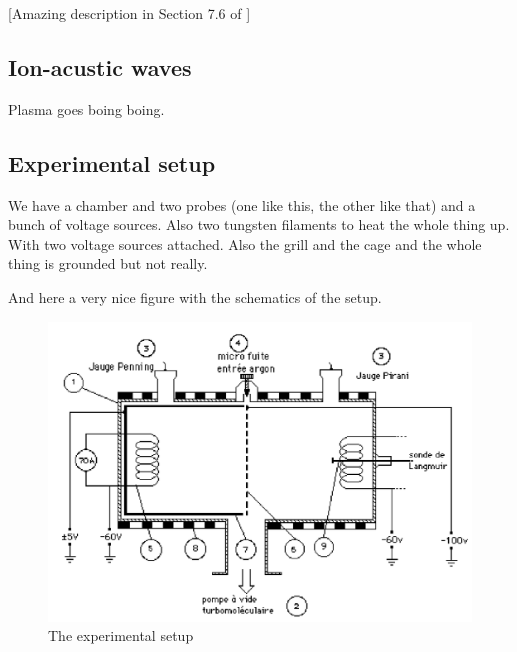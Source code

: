 [Amazing description in Section 7.6 of \cite{piel_plasma_2017}]

\subsection{Ion-acustic waves}
Plasma goes boing boing.

\subsection{Experimental setup}
We have a chamber and two probes (one like this, the other like that) and a bunch of voltage sources.
Also two tungsten filaments to heat the whole thing up.
With two voltage sources attached.
Also the grill and the cage and the whole thing is grounded but not really.

And here a very nice figure with the schematics of the setup.
\begin{figure}
    \centering
    \includegraphics[width=12cm]{figures/experimental-setup.png}
    \caption{The experimental setup}
    \label{fig:experimental_setup}
\end{figure}